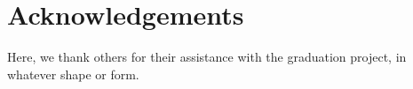 \chapter{Acknowledgements}

Here, we thank others for their assistance with the graduation project, 
in whatever shape or form. 